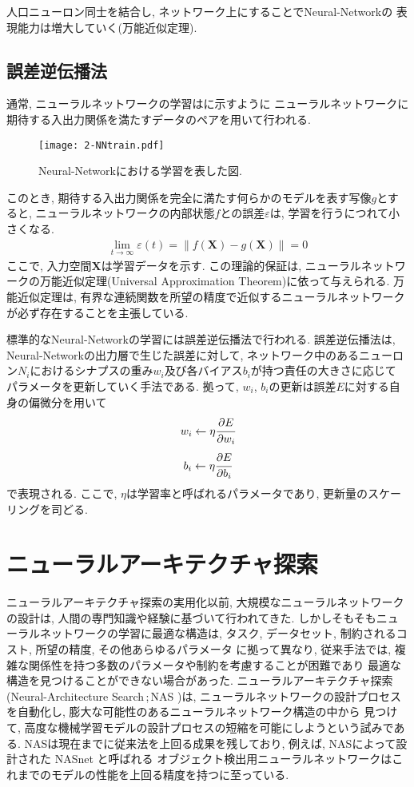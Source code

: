 人口ニューロン同士を結合し, ネットワーク上にすることでNeural-Networkの
表現能力は増大していく(万能近似定理). 
\subsection*{誤差逆伝播法}
通常, ニューラルネットワークの学習はに示すように
ニューラルネットワークに期待する入出力関係を満たすデータのペアを用いて行われる.
\begin{figure}[H]
  \centering
  \texttt{[image: 2-NNtrain.pdf]}
  \caption{Neural-Networkにおける学習を表した図.}
  \label{fig:2-NNtrain}
\end{figure}
このとき, 期待する入出力関係を完全に満たす何らかのモデルを表す写像$g$とすると, 
ニューラルネットワークの内部状態$f$との誤差$\varepsilon$は, 学習を行うにつれて小さくなる.
\begin{align}
 \displaystyle\lim_{t\rightarrow \infty}\displaystyle\varepsilon(t)=\|f(\bm{X})-g(\bm{X})\|=0
\end{align}
ここで, 入力空間$\bm{X}$は学習データを示す.
この理論的保証は, ニューラルネットワークの万能近似定理(Universal Approximation Theorem)に依って与えられる.
万能近似定理は, 有界な連続関数を所望の精度で近似するニューラルネットワークが必ず存在することを主張している.


標準的なNeural-Networkの学習には誤差逆伝播法で行われる.
誤差逆伝播法は, Neural-Networkの出力層で生じた誤差に対して, 
ネットワーク中のあるニューロン$N_i$におけるシナプスの重み$w_i$及び各バイアス$b_i$が持つ責任の大きさに応じて
パラメータを更新していく手法である.
拠って, $w_i$, $b_i$の更新は誤差$E$に対する自身の偏微分を用いて
\begin{align}
  w_i\leftarrow\eta\cfrac{\partial E}{\partial w_i}
\end{align}
\begin{align}
  b_i\leftarrow\eta\cfrac{\partial E}{\partial b_i}
\end{align}
で表現される.
ここで, $\eta$は学習率と呼ばれるパラメータであり, 
更新量のスケーリングを司どる.
\section{ニューラルアーキテクチャ探索}
ニューラルアーキテクチャ探索の実用化以前, 大規模なニューラルネットワークの設計は, 人間の専門知識や経験に基づいて行われてきた.
しかしそもそもニューラルネットワークの学習に最適な構造は, タスク, データセット,
制約されるコスト, 所望の精度, その他あらゆるパラメータ
に拠って異なり, 従来手法では, 
複雑な関係性を持つ多数のパラメータや制約を考慮することが困難であり
最適な構造を見つけることができない場合があった.
ニューラルアーキテクチャ探索(Neural-Architecture Search\,;\,NAS )は, 
ニューラルネットワークの設計プロセスを自動化し, 膨大な可能性のあるニューラルネットワーク構造の中から
見つけて, 高度な機械学習モデルの設計プロセスの短縮を可能にしようという試みである.
NASは現在までに従来法を上回る成果を残しており, 
例えば, NASによって設計された NASnet と呼ばれる
オブジェクト検出用ニューラルネットワークはこれまでのモデルの性能を上回る精度を持つに至っている.
